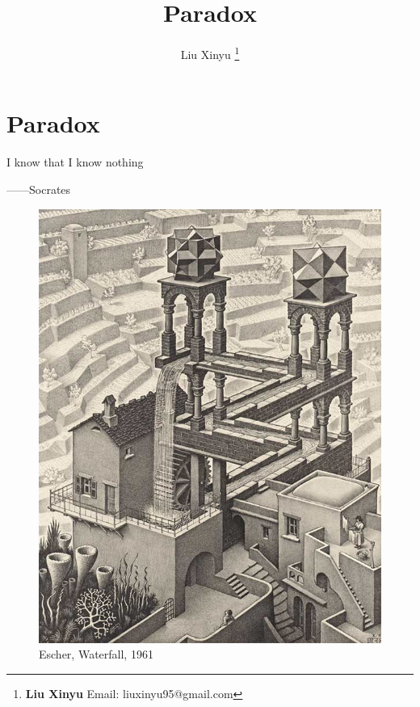 \documentclass{article}
\begin{document}
\title{Paradox}

\author{Liu Xinyu
\thanks{{\bfseries Liu Xinyu} \newline
  Email: liuxinyu95@gmail.com \newline}
  }

\maketitle
\fi


\ifx\wholebook\relax
\chapter{Paradox}
\fi

\epigraph{I know that I know nothing}{——Socrates}

\begin{figure}
 \centering
 \includegraphics[scale=0.3]{img/Escher-Waterfall-1961.jpg}
 \captionsetup{labelformat=empty}
 \caption{Escher, Waterfall, 1961}
 \label{fig:Escher-Waterfall}
\end{figure}
\end{document}
